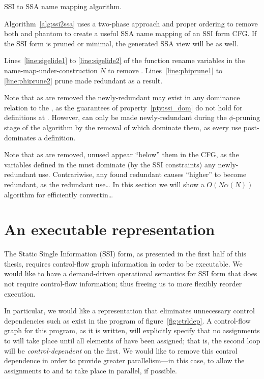 \documentclass[12pt,titlepage,twoside]{article}
\let\oldsection\section
\renewcommand{\section}{\setcounter{figure}{0}\setcounter{table}{0}\oldsection}
\begin{document}
{\begin{myalgorithm}\small

\caption{SSI to SSA name mapping algorithm.}
\label{alg:ssi2ssa}
\end{myalgorithm}
Algorithm~\ref{alg:ssi2ssa} uses a two-phase approach and proper
ordering to remove both  and phantom  to
create a useful SSA name mapping of an SSI form CFG.  If the SSI form
is pruned or minimal, the generated SSA view will be as well.

Lines~\ref{line:sigelide1} to \ref{line:sigelide2} of the
 function rename variables in the
name-map-under-construction $N$ to remove .
Lines~\ref{line:phiprune1} to \ref{line:phiprune2} prune
 made redundant as a result.

Note that as  are removed the newly-redundant
 may exist in any dominance relation to the
\sigfunction{}, as the guarantees of property~\ref{pty:ssi_dom} do not
hold for definitions at .  However,  can
only be made newly-redundant during the $\phi$-pruning stage of the
algorithm by the removal of  which dominate them, as
every use post-dominates a \phifunction{} definition.

Note that as  are removed, unused 
appear ``below'' them in the CFG, as the variables defined in the
\sigfunction{} must dominate (by the SSI constraints) any
newly-redundant use.  Contrariwise, any  found
redundant causes ``higher''  to become redundant, as
the redundant use\ldots
%
In this section we will show a $O(N\alpha(N))$ algorithm for
efficiently convertin\ldots %
} %

\section{An executable representation}\label{sec:ssiplus}
The Static Single Information (SSI) form, as presented in the first
half of this thesis,
requires control-flow graph information in order to be executable. We
would like to have a demand-driven operational semantics for SSI form
that does not require control-flow information; thus freeing us to
more flexibly reorder execution.

In particular, we would like a representation that eliminates
unnecessary control dependencies such as exist in the program of
figure~\vref{fig:ctrldep}.  A control-flow graph for this program, as
it is written, will explicitly specify that no assignments to
 will take place until all elements of  have
been assigned; that is, the second loop will be
\emph{control-dependent} on the first.  We would like to remove this
control dependence in order to provide greater parallelism---in this
case, to allow the assignments to  and  to
take place in parallel, if possible.
\end{document}
